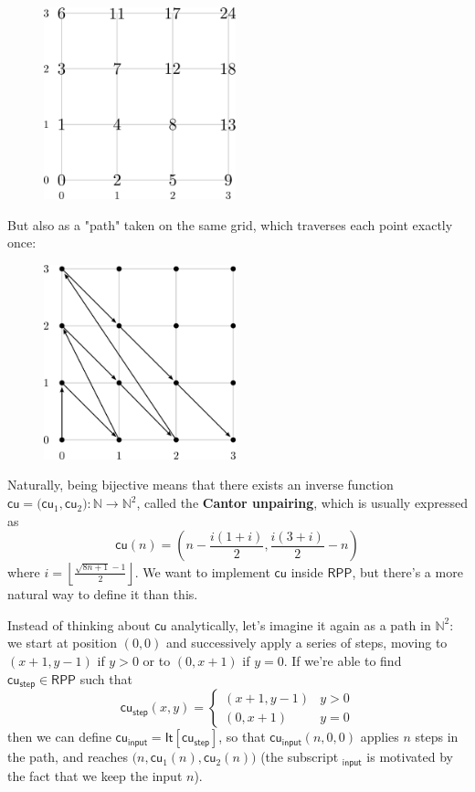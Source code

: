 \documentclass{book}
\theoremstyle{definition}
\theoremstyle{remark}
\theoremstyle{plain}
\newcommand{\NN}{\mathbb{N}}
\newcommand{\RPP}{\mathsf{RPP}}
\newcommand{\rppIt}{\mathsf{It}}
\newcommand{\rppcu}{\mathsf{cu}}
\newcommand{\rppcui}{\mathsf{cu_{input}}}
\newcommand{\rppcustep}{\mathsf{cu_{step}}}
\begin{document}
\begin{figure}[H]
  \centering
  \includegraphics[width=15em]{Immagini/cp.png}
\end{figure}

But also as a "path" taken on the same grid, which traverses each point exactly once:

\begin{figure}[H]
  \centering
  \includegraphics[width=15em]{Immagini/cammino.png}
\end{figure}

Naturally, being bijective means that there exists an inverse function $\rppcu = \big( \rppcu_1, \rppcu_2 \big) : \NN \to \NN^2$,
called the \textbf{Cantor unpairing}, which is usually expressed as
\[ \rppcu(n) = \left( n - \frac{i(1+i)}{2}, \frac{i(3+i)}{2} - n \right) \]
where $i = \left\lfloor \frac{\sqrt{8n + 1} - 1}{2} \right\rfloor $.
We want to implement $\rppcu$ inside $\RPP$, but there's a more natural way to define it than this.

Instead of thinking about $\rppcu$ analytically, let's imagine it again as a path in $\NN^2$:
we start at position $(0, 0)$ and successively apply a series of steps,
moving to $(x+1,y-1)$ if $y > 0$ or to $(0, x+1)$ if $y = 0$.
If we're able to find $\rppcustep \in \RPP$ such that
\[ \rppcustep(x,y) = \begin{cases} (x+1,y-1) &  y > 0 \\
                                   (0, x+1) &   y = 0 \end{cases} \]
then we can define $\rppcui = \rppIt[\rppcustep]$, so that $\rppcui(n, 0, 0)$ applies $n$ steps in the path, and reaches $\big( n, \rppcu_1(n), \rppcu_2(n) \big)$
(the subscript $\mathsf{_{input}}$ is motivated by the fact that we keep the input $n$).
\end{document}
